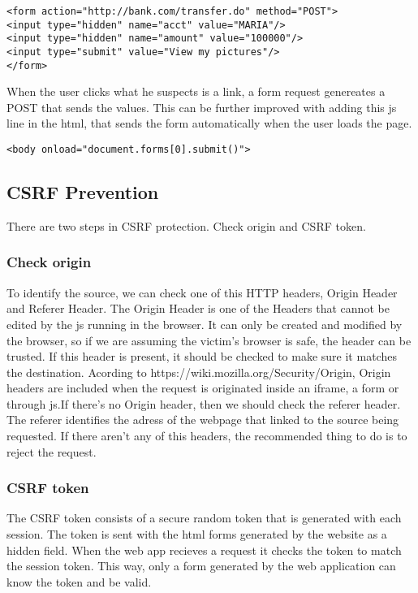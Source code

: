 \begin{verbatim}
<form action="http://bank.com/transfer.do" method="POST">
<input type="hidden" name="acct" value="MARIA"/>
<input type="hidden" name="amount" value="100000"/>
<input type="submit" value="View my pictures"/>
</form>
\end{verbatim}
When the user clicks what he suspects is a link, a form request genereates a POST that sends the values. This can be further improved with adding this js line in the html, that sends the form automatically when the user loads the page.

\begin{verbatim}
<body onload="document.forms[0].submit()">
\end{verbatim}

\subsection{CSRF Prevention}
There are two steps in CSRF protection. Check origin and CSRF token.
\subsubsection{Check 	origin}
To identify the source, we can check one of this HTTP headers, Origin Header and Referer Header.
The Origin Header is one of the Headers that cannot be edited by the js running in the browser. It can only be created and modified by the browser, so if we are assuming the victim's browser is safe, the header can be trusted. If this header is present, it should be checked to make sure it matches the destination. Acording to https://wiki.mozilla.org/Security/Origin, Origin headers are included when the request is originated inside an iframe, a form or through js.If there's no Origin header, then we should check the referer header. The referer identifies the adress of the webpage that linked to the source being requested. If there aren't any of this headers, the recommended thing to do is to reject the request.
\subsubsection{CSRF token}
The CSRF token consists of a secure random token that is generated with each session. The token is sent with the html forms generated by the website as a hidden field. When the web app recieves a request it checks the token to match the session token. This way, only a form generated by the web application can know the token and be valid.

